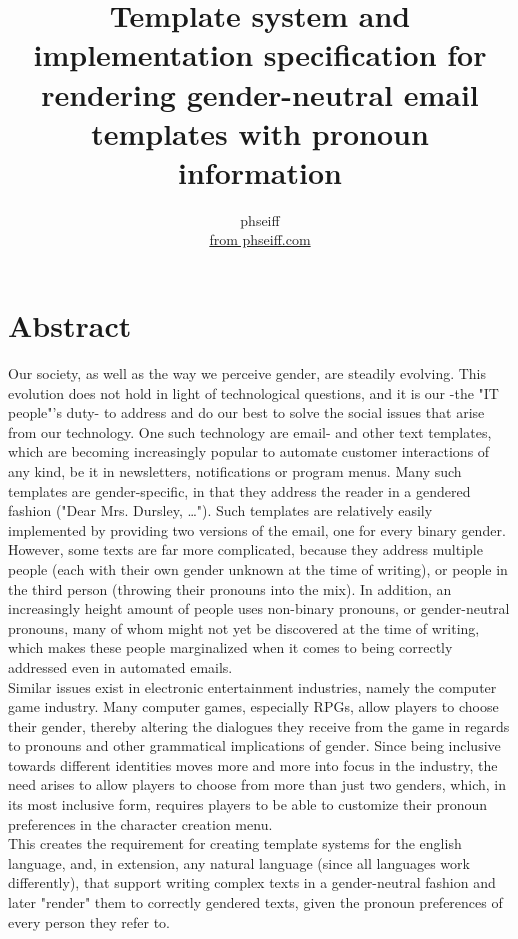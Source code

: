 \documentclass{article}
\author{phseiff\\ \href{https://phseiff.com}{from phseiff.com}\\ {\href{https://github.com/phseiff/gender-render/\#download-specifications--changelog}{\version}}}
\title{
           \titlegraphics{images/title-black.pdf}
Template system and implementation specification for rendering gender-neutral email templates with pronoun information}
\begin{document}
\maketitle
\pagebreak
\tableofcontents
\pagebreak

\section{Abstract}

    Our society, as well as the way we perceive gender, are steadily evolving.
    This evolution does not hold in light of technological questions, and it is our -the "IT people"'s duty- to address and do our best to solve the social issues that arise from our technology.
    One such technology are email- and other text templates, which are becoming increasingly popular to automate customer interactions of any kind, be it in newsletters, notifications or program menus.
    Many such templates are gender-specific, in that they address the reader in a gendered fashion ("Dear Mrs. Dursley, \ldots").
    Such templates are relatively easily implemented by providing two versions of the email, one for every binary gender.
    However, some texts are far more complicated, because they address multiple people (each with their own gender unknown at the time of writing), or people in the third person (throwing their pronouns into the mix).
    In addition, an increasingly height amount of people uses non-binary pronouns, or gender-neutral pronouns, many of whom might not yet be discovered at the time of writing, which makes these people marginalized when it comes to being correctly addressed even in automated emails.\\

    Similar issues exist in electronic entertainment industries, namely the computer game industry.
    Many computer games, especially RPGs, allow players to choose their gender, thereby altering the dialogues they receive from the game in regards to pronouns and other grammatical implications of gender.
    Since being inclusive towards different identities moves more and more into focus in the industry, the need arises to allow players to choose from more than just two genders, which, in its most inclusive form, requires players to be able to customize their pronoun preferences in the character creation menu.\\

    This creates the requirement for creating template systems for the english language, and, in extension, any natural language (since all languages work differently), that support writing complex texts in a gender-neutral fashion and later "render" them to correctly gendered texts, given the pronoun preferences of every person they refer to.\\
\end{document}
